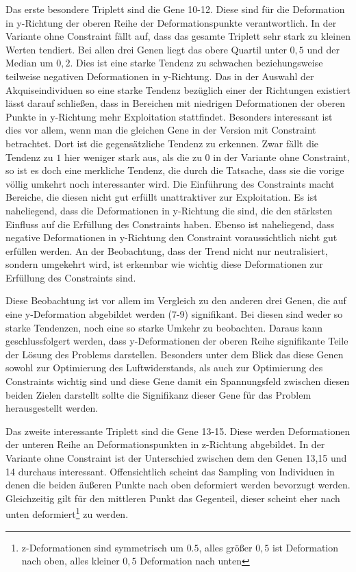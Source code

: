 Das erste besondere Triplett sind die Gene 10-12.
Diese sind für die Deformation in y-Richtung der oberen Reihe der Deformationspunkte verantwortlich.
In der Variante ohne Constraint fällt auf, dass das gesamte Triplett sehr stark zu kleinen Werten tendiert. 
Bei allen drei Genen liegt das obere Quartil unter $0,5$ und der Median um $0,2$.
Dies ist eine starke Tendenz zu schwachen beziehungsweise teilweise negativen Deformationen in y-Richtung.
Das in der Auswahl der Akquiseindividuen so eine starke Tendenz bezüglich einer der Richtungen existiert lässt darauf schließen, dass in Bereichen mit niedrigen Deformationen der oberen Punkte in y-Richtung mehr Exploitation stattfindet.
Besonders interessant ist dies vor allem, wenn man die gleichen Gene in der Version mit Constraint betrachtet.
Dort ist die gegensätzliche Tendenz zu erkennen.
Zwar fällt die Tendenz zu $1$ hier weniger stark aus, als die zu $0$ in der Variante ohne Constraint, so ist es doch eine merkliche Tendenz, die durch die Tatsache, dass sie die vorige völlig umkehrt noch interessanter wird.
Die Einführung des Constraints macht Bereiche, die diesen nicht gut erfüllt unattraktiver zur Exploitation.
Es ist naheliegend, dass die Deformationen in y-Richtung die sind, die den stärksten Einfluss auf die Erfüllung des Constraints haben.
Ebenso ist naheliegend, dass negative Deformationen in y-Richtung den Constraint voraussichtlich nicht gut erfüllen werden.
An der Beobachtung, dass der Trend nicht nur neutralisiert, sondern umgekehrt wird, ist erkennbar wie wichtig diese Deformationen zur Erfüllung des Constraints sind.

Diese Beobachtung ist vor allem im Vergleich zu den anderen drei Genen, die auf eine y-Deformation abgebildet werden (7-9) signifikant.
Bei diesen sind weder so starke Tendenzen, noch eine so starke Umkehr zu beobachten.
Daraus kann geschlussfolgert werden, dass y-Deformationen der oberen Reihe signifikante Teile der Lösung des Problems darstellen.
Besonders unter dem Blick das diese Genen sowohl zur Optimierung des Luftwiderstands, als auch zur Optimierung des Constraints wichtig sind und diese Gene damit ein Spannungsfeld zwischen diesen beiden Zielen darstellt sollte die Signifikanz dieser Gene für das Problem herausgestellt werden.

Das zweite interessante Triplett sind die Gene 13-15.
Diese werden Deformationen der unteren Reihe an Deformationspunkten in z-Richtung abgebildet.
In der Variante ohne Constraint ist der Unterschied zwischen dem den Genen 13,15 und 14 durchaus interessant.
Offensichtlich scheint das Sampling von Individuen in denen die beiden äußeren Punkte nach oben deformiert werden bevorzugt werden.
Gleichzeitig gilt für den mittleren Punkt das Gegenteil, dieser scheint eher nach unten deformiert\footnote{z-Deformationen sind symmetrisch um $0.5$, alles größer $0,5$ ist Deformation nach oben, alles kleiner $0,5$ Deformation nach unten} zu werden.

